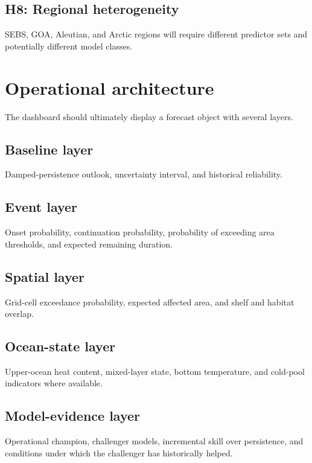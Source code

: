 \documentclass[11pt]{article}
\begin{document}
\subsection*{H8: Regional heterogeneity}
SEBS, GOA, Aleutian, and Arctic regions will require different predictor sets and potentially different model classes.

\section{Operational architecture}

The dashboard should ultimately display a forecast object with several layers.

\subsection{Baseline layer}

Damped-persistence outlook, uncertainty interval, and historical reliability.

\subsection{Event layer}

Onset probability, continuation probability, probability of exceeding area thresholds, and expected remaining duration.

\subsection{Spatial layer}

Grid-cell exceedance probability, expected affected area, and shelf and habitat overlap.

\subsection{Ocean-state layer}

Upper-ocean heat content, mixed-layer state, bottom temperature, and cold-pool indicators where available.

\subsection{Model-evidence layer}

Operational champion, challenger models, incremental skill over persistence, and conditions under which the challenger has historically helped.
\end{document}
